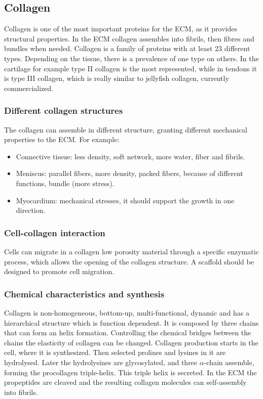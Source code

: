 	\subsection{Collagen}
	Collagen is one of the most important proteins for the ECM, as it provides structural properties.
	In the ECM collagen assembles into fibrils, then fibres and bundles when needed.
	Collagen is a family of proteins with at least 23 different types.
	Depending on the tissue, there is a prevalence of one type on others.
	In the cartilage for example type II collagen is the most represented, while in tendons it is type III collagen, which is really similar to jellyfish collagen, currently commercialized.

		\subsubsection{Different collagen structures}
		The collagen can assemble in different structure, granting different mechanical properties to the ECM.
		For example:

		\begin{multicols}{2}
			\begin{itemize}
				\item Connective tissue: less density, soft network, more water, fiber and fibrils.
				\item Meniscus: parallel fibers, more density, packed fibers, because of different functions, bundle (more stress).
				\item Myocardium: mechanical stresses, it should support the growth in one direction.
			\end{itemize}
		\end{multicols}

		\subsubsection{Cell-collagen interaction}
		Cells can migrate in a collagen low porosity material through a specific enzymatic process, which allows the opening of the collagen structure.
		A scaffold should be designed to promote cell migration.

		\subsubsection{Chemical characteristics and synthesis}
		Collagen is non-homogeneous, bottom-up, multi-functional, dynamic and has a hierarchical structure which is function dependent.
		It is composed by three chains that can form an helix formation.
		Controlling the chemical bridges between the chains the elasticity of collagen can be changed.
		Collagen production starts in the cell, where it is synthesized.
		Then selected prolines and lysines in it are hydrolysed.
		Later the hydrolysines are glycosylated, and three $\alpha$-chain assemble, forming the procollagen triple-helix.
		This triple helix is secreted.
		In the ECM the propeptides are cleaved and the resulting collagen molecules can self-assembly into fibrils.

